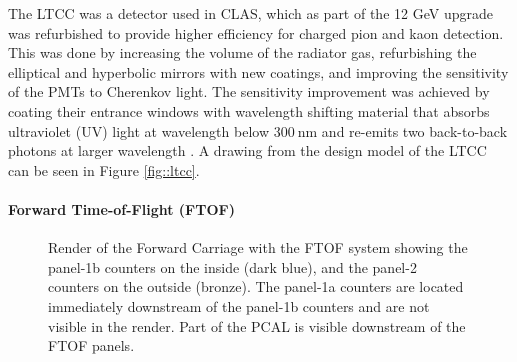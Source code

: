     The LTCC was a detector used in CLAS, which as part of the 12 GeV upgrade was refurbished to provide higher efficiency for charged pion and kaon detection.
    This was done by increasing the volume of the radiator gas, refurbishing the elliptical and hyperbolic mirrors with new coatings, and improving the sensitivity of the PMTs to Cherenkov light.
    The sensitivity improvement was achieved by coating their entrance windows with wavelength shifting material that absorbs ultraviolet (UV) light at wavelength below $300 ~\text{nm}$ and re-emits two back-to-back photons at larger wavelength \cite{ungaro2020}.
    A drawing from the design model of the LTCC can be seen in Figure \ref{fig::ltcc}.

\paragraph{Forward Time-of-Flight (FTOF)}
    \begin{figure}
        \centering{}
        \caption[FTOF]{Render of the Forward Carriage with the FTOF system showing the panel-1b counters on the inside (dark blue), and the panel-2 counters on the outside (bronze).
        The panel-1a counters are located immediately downstream of the panel-1b counters and are not visible in the render.
        Part of the PCAL is visible downstream of the FTOF panels.}
        \label{fig::ftof}
    \end{figure}

